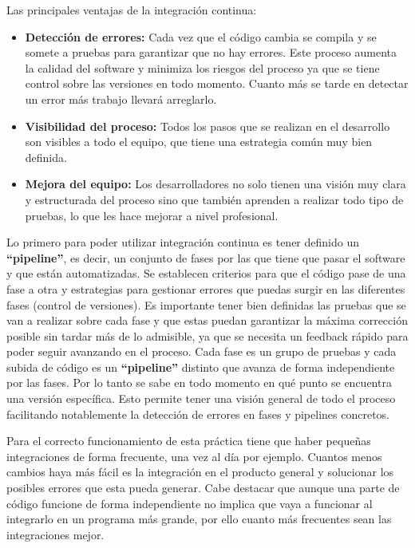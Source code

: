 Las principales ventajas de la integración continua:

\begin{itemize}
	\item \textbf{Detección de errores:} Cada vez que el código cambia se compila y se somete a pruebas para garantizar que no hay errores. Este proceso aumenta la calidad del software y minimiza los riesgos del proceso ya que se tiene control sobre las versiones en todo momento. Cuanto más se tarde en detectar un error más trabajo llevará arreglarlo.
	\item \textbf{Visibilidad del proceso:} Todos los pasos que se realizan en el desarrollo son visibles a todo el equipo, que tiene una estrategia común muy bien definida.
	\item \textbf{Mejora del equipo:} Los desarrolladores no solo tienen una visión muy clara y estructurada del proceso sino que también aprenden a realizar todo tipo de pruebas, lo que les hace mejorar a nivel profesional. 
\end{itemize}

Lo primero para poder utilizar integración continua es tener definido un \textbf{"`pipeline"'}, es decir, un conjunto de fases por las que tiene que pasar el software y que están automatizadas. Se establecen criterios para que el código pase de una fase a otra y estrategias para gestionar errores que puedas surgir en las diferentes fases (control de versiones). Es importante tener bien definidas las pruebas que se van a realizar sobre cada fase y que estas puedan garantizar la máxima corrección posible sin tardar más de lo admisible, ya que se necesita un feedback rápido para poder seguir avanzando en el proceso. Cada fase es un grupo de pruebas y cada subida de código es un \textbf{"`pipeline"'} distinto que avanza de forma independiente por las fases. Por lo tanto se sabe en todo momento en qué punto se encuentra una versión específica. Esto permite tener una visión general de todo el proceso facilitando notablemente la detección de errores en fases y pipelines concretos.

Para el correcto funcionamiento de esta práctica tiene que haber pequeñas integraciones de forma frecuente, una vez al día por ejemplo. Cuantos menos cambios haya más fácil es la integración en el producto general y solucionar los posibles errores que esta pueda generar. Cabe destacar que aunque una parte de código funcione de forma independiente no implica que vaya a funcionar al integrarlo en un programa más grande, por ello cuanto más frecuentes sean las integraciones mejor. 

